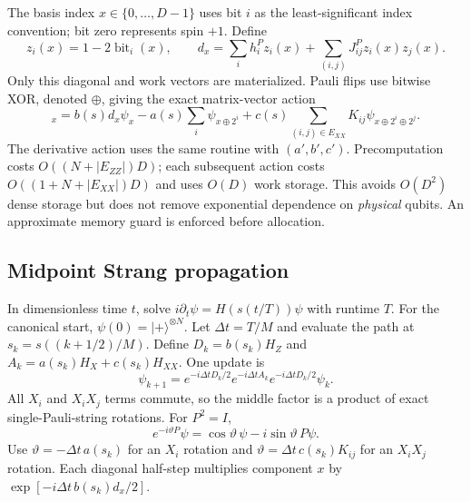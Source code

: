 \documentclass[10pt]{article}
\newcommand{\ket}[1]{\lvert #1\rangle}
\begin{document}
The basis index $x\in\{0,\ldots,D-1\}$ uses bit $i$ as the least-significant
index convention; bit zero represents spin $+1$. Define
\begin{equation}
 z_i(x)=1-2\operatorname{bit}_i(x),\qquad
 d_x=\sum_i h_i^Pz_i(x)+\sum_{(i,j)}J_{ij}^Pz_i(x)z_j(x).
\end{equation}
Only this diagonal and work vectors are materialized. Pauli flips use bitwise
XOR, denoted $\oplus$, giving the exact matrix-vector action
\begin{equation}
 [H(s)\psi]_x=b(s)d_x\psi_x
 -a(s)\sum_i\psi_{x\oplus 2^i}
 +c(s)\sum_{(i,j)\in E_{XX}}K_{ij}\psi_{x\oplus 2^i\oplus 2^j}.
 \label{eq:matvec}
\end{equation}
The derivative action uses the same routine with $(a',b',c')$.
Precomputation costs $O((N+|E_{ZZ}|)D)$; each subsequent action costs
$O((1+N+|E_{XX}|)D)$ and uses $O(D)$ work storage. This avoids $O(D^2)$
dense storage but does not remove exponential dependence on \emph{physical}
qubits. An approximate memory guard is enforced before allocation.

\subsection{Midpoint Strang propagation}
In dimensionless time $t$, solve $i\partial_t\psi=H(s(t/T))\psi$ with
runtime $T$. For the canonical start, $\psi(0)=\ket{+}^{\otimes N}$.
Let $\Delta t=T/M$ and evaluate the path at
$s_k=s((k+1/2)/M)$. Define $D_k=b(s_k)H_Z$ and
$A_k=a(s_k)H_X+c(s_k)H_{XX}$. One update is
\begin{equation}
 \psi_{k+1}=e^{-i\Delta tD_k/2}
             e^{-i\Delta tA_k}
             e^{-i\Delta tD_k/2}\psi_k.
 \label{eq:strang}
\end{equation}
All $X_i$ and $X_iX_j$ terms commute, so the middle factor is a product of
exact single-Pauli-string rotations. For $P^2=I$,
\begin{equation}
 e^{-i\vartheta P}\psi=\cos\vartheta\,\psi-i\sin\vartheta\,P\psi.
\end{equation}
Use $\vartheta=-\Delta t\,a(s_k)$ for an $X_i$ rotation and
$\vartheta=\Delta t\,c(s_k)K_{ij}$ for an $X_iX_j$ rotation. Each diagonal
half-step multiplies component $x$ by $\exp[-i\Delta t\,b(s_k)d_x/2]$.
\end{document}
